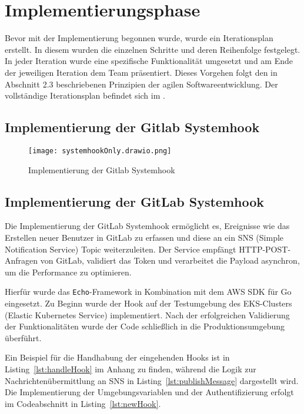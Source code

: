 \section{Implementierungsphase} 
\label{sec:Implementierungsphase}

Bevor mit der Implementierung begonnen wurde, wurde ein Iterationsplan erstellt. In diesem wurden die einzelnen Schritte und deren Reihenfolge festgelegt. In jeder Iteration wurde eine spezifische Funktionalität umgesetzt und am Ende der jeweiligen Iteration dem Team präsentiert. Dieses Vorgehen folgt den in Abschnitt 2.3 beschriebenen Prinzipien der agilen Softwareentwicklung. Der vollständige Iterationsplan befindet sich im .

\subsection{Implementierung der Gitlab Systemhook}
\label{sec:ImplementierungDatenstrukturen}

\begin{figure}[htb]
	\centering
	\texttt{[image: systemhookOnly.drawio.png]}
	\caption{Implementierung der Gitlab Systemhook}
\end{figure}

\subsection{Implementierung der GitLab Systemhook}
\label{sec:ImplementierungGitlabSystemhook}

Die Implementierung der GitLab Systemhook ermöglicht es, Ereignisse wie das Erstellen neuer Benutzer in GitLab zu erfassen und diese an ein SNS (Simple Notification Service) Topic weiterzuleiten. Der Service empfängt HTTP-POST-Anfragen von GitLab, validiert das Token und verarbeitet die Payload asynchron, um die Performance zu optimieren. 

Hierfür wurde das \texttt{Echo}-Framework in Kombination mit dem AWS SDK für Go eingesetzt. Zu Beginn wurde der Hook auf der Testumgebung des EKS-Clusters (Elastic Kubernetes Service) implementiert. Nach der erfolgreichen Validierung der Funktionalitäten wurde der Code schließlich in die Produktionsumgebung überführt. 

Ein Beispiel für die Handhabung der eingehenden Hooks ist in Listing~\ref{lst:handleHook} im Anhang zu finden, während die Logik zur Nachrichtenübermittlung an SNS in Listing~\ref{lst:publishMessage} dargestellt wird. Die Implementierung der Umgebungsvariablen und der Authentifizierung erfolgt im Codeabschnitt in Listing~\ref{lst:newHook}. 

